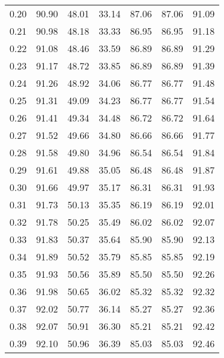 \begin{tabular}{|c|c|c|c|c|c|c|}
      0.20 &     90.90 &     48.01 &      33.14 &   87.06 &      87.06 &         91.09 \\
      0.21 &     90.98 &     48.18 &      33.33 &   86.95 &      86.95 &         91.18 \\
      0.22 &     91.08 &     48.46 &      33.59 &   86.89 &      86.89 &         91.29 \\
      0.23 &     91.17 &     48.72 &      33.85 &   86.89 &      86.89 &         91.39 \\
      0.24 &     91.26 &     48.92 &      34.06 &   86.77 &      86.77 &         91.48 \\
      0.25 &     91.31 &     49.09 &      34.23 &   86.77 &      86.77 &         91.54 \\
      0.26 &     91.41 &     49.34 &      34.48 &   86.72 &      86.72 &         91.64 \\
      0.27 &     91.52 &     49.66 &      34.80 &   86.66 &      86.66 &         91.77 \\
      0.28 &     91.58 &     49.80 &      34.96 &   86.54 &      86.54 &         91.84 \\
      0.29 &     91.61 &     49.88 &      35.05 &   86.48 &      86.48 &         91.87 \\
      0.30 &     91.66 &     49.97 &      35.17 &   86.31 &      86.31 &         91.93 \\
      0.31 &     91.73 &     50.13 &      35.35 &   86.19 &      86.19 &         92.01 \\
      0.32 &     91.78 &     50.25 &      35.49 &   86.02 &      86.02 &         92.07 \\
      0.33 &     91.83 &     50.37 &      35.64 &   85.90 &      85.90 &         92.13 \\
      0.34 &     91.89 &     50.52 &      35.79 &   85.85 &      85.85 &         92.19 \\
      0.35 &     91.93 &     50.56 &      35.89 &   85.50 &      85.50 &         92.26 \\
      0.36 &     91.98 &     50.65 &      36.02 &   85.32 &      85.32 &         92.32 \\
      0.37 &     92.02 &     50.77 &      36.14 &   85.27 &      85.27 &         92.36 \\
      0.38 &     92.07 &     50.91 &      36.30 &   85.21 &      85.21 &         92.42 \\
      0.39 &     92.10 &     50.96 &      36.39 &   85.03 &      85.03 &         92.46 \\

\end{tabular}
